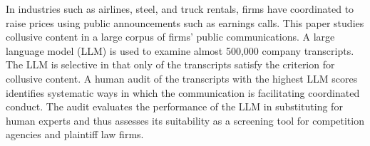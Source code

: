 In industries such as airlines, steel, and truck rentals, firms have coordinated to raise prices using public announcements such as earnings calls. 
This paper studies collusive content in a large corpus of firms' public communications. 
A large language model (LLM) is used to examine almost 500,000 company transcripts. The LLM is selective in that only  of the transcripts 
satisfy the criterion for collusive content. A human audit of the  transcripts with the highest LLM scores identifies systematic ways in which the communication is facilitating coordinated conduct. 
The audit evaluates the performance of the 
LLM in substituting for human experts and thus assesses its suitability as a screening tool for competition agencies and plaintiff law firms.